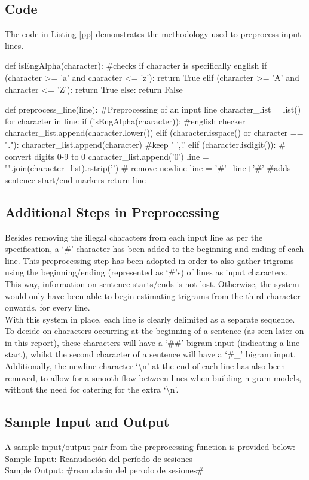 \documentclass[12pt]{article}
\begin{document}
\subsection{Code}
The code in Listing \ref{pp} demonstrates the methodology used to preprocess input lines.
\begin{python}[caption = {Line Preprocessing},label = {pp}]
def isEngAlpha(character):
#checks if character is specifically english
	if (character >= 'a' and character <= 'z'):
		return True
	elif (character >= 'A' and character <= 'Z'):
		return True
	else:
		return False

def preprocess_line(line):
#Preprocessing of an input line
	character_list = list()
	for character in line:
		if (isEngAlpha(character)): #english checker
			character_list.append(character.lower()) 
		elif (character.isspace() or character == "."): 
			character_list.append(character) #keep ' ','.'
		elif (character.isdigit()):
			# convert digits {0-9} to 0
			character_list.append('0') 
	line = "".join(character_list).rstrip('\n') # remove newline  
	line = '#'+line+'#' #adds sentence start/end markers
	return line
\end{python}
\subsection{Additional Steps in Preprocessing}
Besides removing the illegal characters from each input line as per the specification, a `\#' character has been added to the beginning and ending of each line. This preprocessing step has been adopted in order to also gather trigrams using the beginning/ending (represented as `\#'s) of lines as input characters.  This way, information on sentence starts/ends is not lost.  Otherwise, the system would only have been able to begin estimating trigrams from the third character onwards, for every line.  \\
\hfill\break
With this system in place, each line is clearly delimited as a separate sequence.  To decide on characters occurring at the beginning of a sentence (as seen later on in this report), these characters will have a `\#\#' bigram input (indicating a line start), whilst the second character of a sentence will have a `\#\_' bigram input. \\
\hfill\break
Additionally, the newline character `\textbackslash n' at the end of each line has also been removed, to allow for a smooth flow between lines when building n-gram models, without the need for catering for the extra `\textbackslash n'.
\subsection{Sample Input and Output}
A sample input/output pair from the preprocessing function is provided below:\\
\hfill\break
Sample Input: Reanudación del período de sesiones\\
Sample Output: \#reanudacin del perodo de sesiones\#
\end{document}
